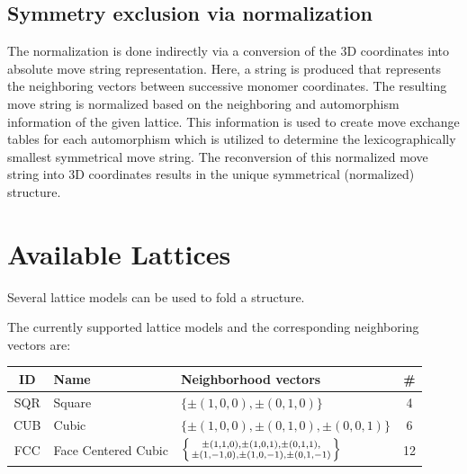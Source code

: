 \documentclass{article}
\begin{document}
\subsection{Symmetry exclusion via normalization}
\label{sec:moveNormalization}


The normalization is done indirectly via a conversion of the 3D coordinates into
absolute move string representation. Here, a string is produced that represents
the neighboring vectors between successive monomer coordinates. The resulting
move string is normalized based on the neighboring and automorphism information
of the given lattice. This information is used to create move exchange tables for
each automorphism which is utilized to determine the lexicographically smallest
symmetrical move string. The reconversion of this normalized move string into 3D
coordinates results in the unique symmetrical (normalized) structure.



\section{Available Lattices}
\label{sec:lat}

Several lattice models can be used to fold a structure. 

\vspace{0.5em}
The currently supported lattice models and the corresponding neighboring
vectors are:

\vspace{0.5em}
\begin{tabular}{c|l|l|c}
	ID & Name & Neighborhood vectors & \#\\
	\hline
	SQR & Square & $\{\pm(1,0,0),\pm(0,1,0)\}$ & 4\\
	CUB & Cubic & $\{\pm(1,0,0),\pm(0,1,0),\pm(0,0,1)\}$ & 6\\
	FCC & Face Centered Cubic & 
	$\left\{\pm(1,1,0),\pm(1,0,1),\pm(0,1,1), \atop
	\pm(1,-1,0),\pm(1,0,-1),\pm(0,1,-1)\right\}$ & 12 
\end{tabular}
\end{document}
